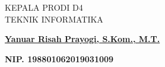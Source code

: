 \begin{center}
    \vspace{1.5cm}
    
    \begin{minipage}[t]{8.0cm}
        \centering
        {\fontsize{12pt}{14pt}\selectfont KEPALA PRODI D4\\
            TEKNIK INFORMATIKA\par}
        \vspace{3cm}
        \underline{\fontsize{12pt}{14pt}\textbf{Yanuar Risah Prayogi, S.Kom., M.T.}}\\
        {\fontsize{12pt}{14pt}\textbf{NIP. 198801062019031009}\par}
    \end{minipage}
    
\end{center}
\newpage
